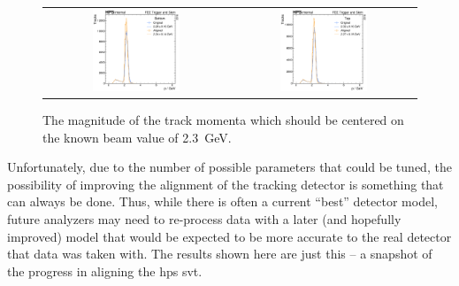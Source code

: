 \begin{figure}
  \centering
  \begin{tabular}{cc}
    \includegraphics[width=0.49\textwidth]{figures/hps/alignment/p_bottom.pdf}
    &
    \includegraphics[width=0.49\textwidth]{figures/hps/alignment/p_top.pdf}
  \end{tabular}
  \caption{The magnitude of the track momenta which should be centered on
  the known beam value of \qty{2.3}{\giga\electronvolt}.}
  \label{fig:example-align-p}
\end{figure}

Unfortunately, due to the number of possible parameters that could be tuned,
the possibility of improving the alignment of the tracking detector is something
that can always be done.
Thus, while there is often a current ``best'' detector model, future analyzers
may need to re-process data with a later (and hopefully improved) model that
would be expected to be more accurate to the real detector that data was taken with.
The results shown here are just this -- a snapshot of the progress in aligning the
\ac{hps} \ac{svt}.